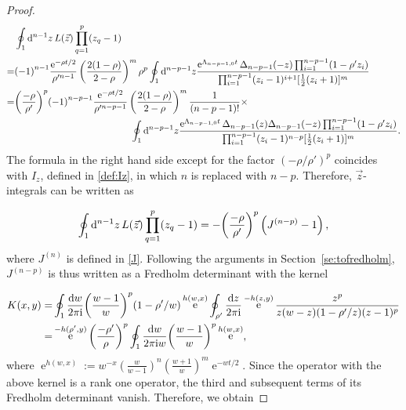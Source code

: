\documentclass[cmp]{svjour}
\numberwithin{theorem}{section}
\numberwithin{equation}{section}
\DeclareMathOperator{\e}{e}
\def\dd{{\rm d}}
\def\ii{{\rm i}}
\begin{document}
\begin{proof}
\begin{equation*}
\begin{split}
& \oint_1 \dd^{n-1} z\,  L(\vec{z}) \prod_{q=1}^{p}(z_q-1) \\
= & {(-1)}^{n-1}
\frac{\e^{-\rho t/2}}{\rho'^{n-1}} \left(\frac{2(1-\rho)}{2-\rho}\right)^m \rho^p
\oint_{1}\dd^{n-p-1}z
\frac{\e^{\Lambda_{n-p-1,0} t}
\Delta_{n-p-1}(-z)
\prod_{i=1}^{n-p-1}   (1-\rho'z_i)  }
{\prod_{i=1}^{n-p-1}(z_i-1)^{i+1}
[\frac{1}{2}(z_i+1)]^m} \\
= & {\left( \frac{- \rho}{\rho'} \right)}^p {(-1)}^{n-p-1}
\frac{\e^{-\rho t/2}}{\rho'^{n-p-1}} \left(\frac{2(1-\rho)}{2-\rho}\right)^m \frac{1}{(n-p-1)! } \times \\
& \qquad \qquad \qquad \qquad \qquad \qquad \oint_{1}\dd^{n-p-1}z
\frac{\e^{\Lambda_{n-p-1,0} t}
\Delta_{n-p-1}(z) \Delta_{n-p-1}(-z)
\prod_{i=1}^{n-p-1}  (1-\rho'z_i)  }
{\prod_{i=1}^{n-p-1}(z_i-1)^{n-p}
[\frac{1}{2}(z_i+1)]^m} .
\end{split}
\end{equation*}
The formula in the right hand side except for the factor ${(-\rho / \rho')}^p$ coincides with $I_z$, defined in \eqref{def:Iz}, in which $n$ is replaced with $n-p$. 
Therefore, $\vec{z}$-integrals can be written as



\begin{equation}
\label{z-integral_part}
 \oint_1 \dd^{n-1} z\,  L(\vec{z}) \prod_{q=1}^{p}(z_q-1) = - {\left( \frac{- \rho}{\rho'} \right)}^p \left( J^{(n-p)} - 1 \right) ,
\end{equation}
where $J^{(n)}$ is defined in \eqref{J}.
Following the arguments in Section~\ref{se:tofredholm}, $J^{(n-p)}$ is thus written as a Fredholm determinant with the kernel

\begin{align*}
K(x,y)
=&\oint_1 \frac{\dd w}{2 \pi \ii} {\left( \frac{w-1}{w} \right)}^p(1-\rho'/w)\e^{h(w,x)}
\oint_{\rho'} \frac{\dd z}{2 \pi \ii}
\e^{-h(z,y)}\frac{z^p}{z(w-z)(1-\rho'/z)(z-1)^p}
\\
=&
\e^{-h(\rho',y)} {\left( \frac{-\rho'}{\rho} \right)}^p 
\oint_1 \frac{\dd w}{2 \pi \ii w} {\left( \frac{w-1}{w} \right)}^p  \e^{h(w,x)},
\end{align*}
where
$
\e^{h(w,x)}:=w^{-x}
\left(\frac{w}{w-1}\right)^{n}
\left(\frac{w+1}{w}\right)^{m}
\e^{-wt/2}
$.
Since the operator with the above kernel is a rank one operator, the third and subsequent terms of its Fredholm determinant vanish.
Therefore, we obtain 



\end{proof}
\end{document}
